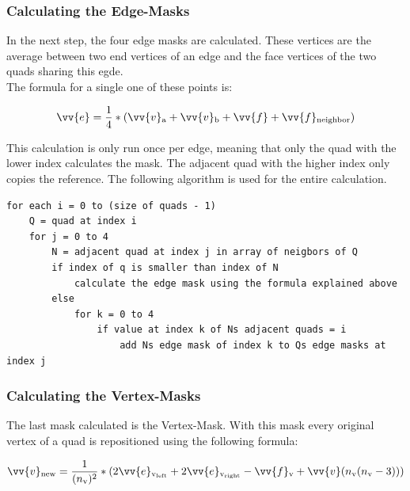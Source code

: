 \documentclass[12pt,a4paper]{scrartcl}
\begin{document}
\subsubsection{Calculating the Edge-Masks}
In the next step, the four edge masks are calculated. These vertices are the average between two end vertices of an edge and the face vertices of the two quads sharing this egde.\\
The formula for a single one of these points is:

$$ \vv{e} = \frac{1}{4} * (\vv{v}\textsubscript{a} + \vv{v}\textsubscript{b} + \vv{f} + \vv{f}\textsubscript{neighbor}) $$

This calculation is only run once per edge, meaning that only the quad with the lower index calculates the mask. The adjacent quad with the higher index only copies the reference. The following algorithm is used for the entire calculation.
\begin{lstlisting}[language=PSEUDO]
for each i = 0 to (size of quads - 1)
	Q = quad at index i
	for j = 0 to 4
		N = adjacent quad at index j in array of neigbors of Q
		if index of q is smaller than index of N
			calculate the edge mask using the formula explained above
		else
			for k = 0 to 4
				if value at index k of Ns adjacent quads = i
					add Ns edge mask of index k to Qs edge masks at index j		
\end{lstlisting} 

\subsubsection{Calculating the Vertex-Masks}
The last mask calculated is the Vertex-Mask. With this mask every original vertex of a quad is repositioned using the following formula:

$$ \vv{v}\textsubscript{new} = \frac{1}{(n\textsubscript{v})^{2}}*(2 \vv{e}\textsubscript{v\textsubscript{left}} + 2 \vv{e}\textsubscript{v\textsubscript{right}} - \vv{f}\textsubscript{v} +\vv{v} (n\textsubscript{v}(n\textsubscript{v}-3))) $$
\end{document}
